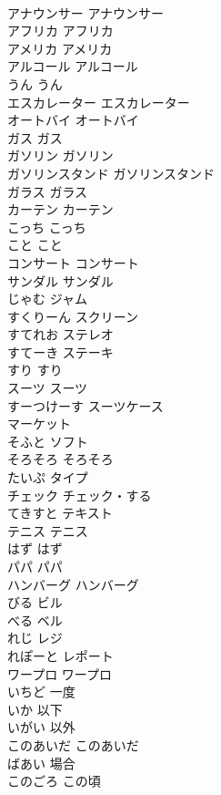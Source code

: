 \documentclass[8pt]{extreport}
\begin{document}
\begin{CJK}{UTF8}{min}
\\	アナウンサー	アナウンサー
\\	アフリカ	アフリカ
\\	アメリカ	アメリカ
\\	アルコール	アルコール
\\	うん	うん
\\	エスカレーター	エスカレーター
\\	オートバイ	オートバイ
\\	ガス	ガス
\\	ガソリン	ガソリン
\\	ガソリンスタンド	ガソリンスタンド
\\	ガラス	ガラス
\\	カーテン	カーテン
\\	こっち	こっち
\\	こと	こと
\\	コンサート	コンサート
\\	サンダル	サンダル
\\	じゃむ	ジャム
\\	すくりーん	スクリーン
\\	すてれお	ステレオ
\\	すてーき	ステーキ
\\	すり	すり
\\	スーツ	スーツ
\\	すーつけーす	スーツケース
\\	マーケット	
\\	そふと	ソフト
\\	そろそろ	そろそろ
\\	たいぷ	タイプ
\\	チェック	チェック・する
\\	てきすと	テキスト
\\	テニス	テニス
\\	はず	はず
\\	パパ	パパ
\\	ハンバーグ	ハンバーグ
\\	びる	ビル
\\	べる	ベル
\\	れじ	レジ
\\	れぽーと	レポート
\\	ワープロ	ワープロ
\\	いちど	一度
\\	いか	以下
\\	いがい	以外
\\	このあいだ	このあいだ
\\	ばあい	場合
\\	このごろ	この頃

\end{CJK}
\end{document}
